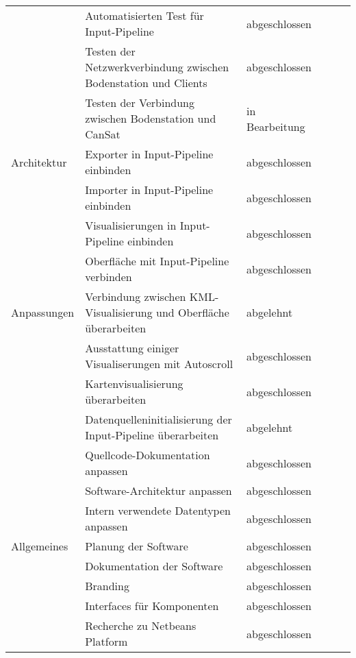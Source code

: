 \begin{table}[H]
\begin{tabular}{p{3cm}p{7cm}p{3cm}rrr}
	& Automatisierten Test für Input-Pipeline & abgeschlossen \\
	& Testen der Netzwerkverbindung zwischen Bodenstation und Clients & abgeschlossen \\
	& Testen der Verbindung zwischen Bodenstation und CanSat & in Bearbeitung \\
	\midrule
	Architektur & Exporter in Input-Pipeline einbinden & abgeschlossen \\
	& Importer in Input-Pipeline einbinden & abgeschlossen \\
	& Visualisierungen in Input-Pipeline einbinden & abgeschlossen \\
	& Oberfläche mit Input-Pipeline verbinden & abgeschlossen \\
	\midrule
	Anpassungen & Verbindung zwischen KML-Visualisierung und Oberfläche überarbeiten & abgelehnt \\
	& Ausstattung einiger Visualiserungen mit Autoscroll & abgeschlossen \\
	& Kartenvisualisierung überarbeiten & abgeschlossen \\
	& Datenquelleninitialisierung der Input-Pipeline überarbeiten & abgelehnt \\
	& Quellcode-Dokumentation anpassen & abgeschlossen \\
	& Software-Architektur anpassen & abgeschlossen \\
	& Intern verwendete Datentypen anpassen & abgeschlossen \\
	\midrule
	Allgemeines & Planung der Software & abgeschlossen \\
	& Dokumentation der Software & abgeschlossen \\
  & Branding & abgeschlossen \\
  & Interfaces für Komponenten & abgeschlossen \\
  & Recherche zu Netbeans Platform & abgeschlossen \\
  \bottomrule
  \bottomrule
 \end{tabular}
 \end{table}
